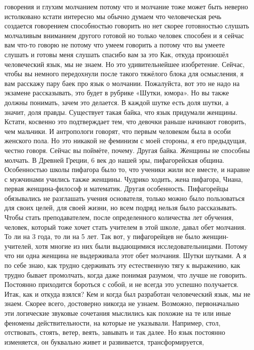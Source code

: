 говорения и глухим молчанием потому что и молчание тоже может быть неверно
истолковано кстати интересно мы обычно думаем что человеческая речь создается
говорением способностью говорить но нет скорее готовностью слушать молчаливым
вниманием другого готовой но только человек способен и я сейчас вам что-то
говорю не потому что умеем говорить а потому что вы умеете слушать и готовы меня
слушать спасибо вам за это Как, откуда произошёл человеческий язык, мы не знаем.
Но это удивительнейшее изобретение. Сейчас, чтобы вы немного передохнули после
такого тяжёлого блока для осмысления, я вам расскажу пару баек про язык о
молчании. Пожалуйста, вот это не надо на экзамене рассказывать, это будет в
рубрике «Шутки, юмора». Но вы также должны понимать, зачем это делается. В
каждой шутке есть доля шутки, а значит, доля правды. Существует такая байка, что
язык придумали женщины. Кстати, косвенно это подтверждает тем, что девочки
раньше начинают говорить, чем мальчики. И антропологи говорят, что первым
человеком была в особи женского пола. Но это никакой не феминизм с моей стороны,
я его предыдущая, честно говоря. Сейчас вы поймёте, почему. Другая байка.
Женщины не способны молчать. В Древней Греции, 6 век до нашей эры, пифагорейская
община. Особенностью школы пифагора было то, что ученики жили все вместе, и
наравне с мужчинами учились также женщины. Чудрико ходить, жена пифагора, Чиана,
первая женщина-философ и математик. Другая особенность. Пифагорейцы обязывались
не разглашать учения основателя, только можно было пользоваться для своих целей,
для своей жизни, но всем подряд нельзя было рассказывать. Чтобы стать
преподавателем, после определенного количества лет обучения, человек, который
тоже хочет стать учителем в этой школе, давал обет молчания. То ли на 3 года, то
ли на 5 лет. Так вот, у пифагорейцев не было женщин-учителей, хотя многие из них
были выдающимися исследовательницами. Потому что ни одна женщина не выдерживала
этот обет молчания. Шутки шутками. А я по себе знаю, как трудно сдерживать эту
естественную тягу к выражению, как трудно бывает промолчать, когда даже понимая
разумом, что лучше не говорить. Постоянно приходится бороться с собой, и не
всегда это успешно получается. Итак, как и откуда взялся? Кем и когда был
разработан человеческий язык, мы не знаем. Скорее всего, достоверно никогда не
узнаем. Возможно, первоначально эти логические звуковые сочетания мыслились как
похожие на те или иные феномены действительности, на которые не указывали.
Например, стол, отствовать, стоять, ветер, веять, завывать и так далее. Но язык
постоянно изменяется, он буквально живет и развивается, трансформируется,
